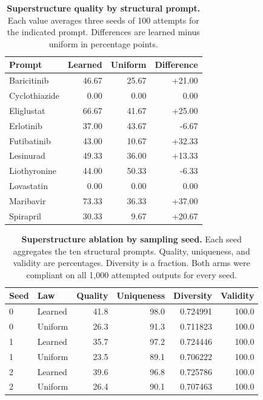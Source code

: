 \begin{table}[t]
\centering
\small
\caption{\small\textbf{Superstructure quality by structural prompt.}
Each value averages three seeds of 100 attempts for the indicated prompt.
Differences are learned minus uniform in percentage points.}
\label{tab:fragment-reference-prompts}
\begin{tabular}{@{}lrrr@{}}
\toprule
Prompt & Learned & Uniform & Difference \\
\midrule
Baricitinib & 46.67 & 25.67 & +21.00 \\
Cyclothiazide & 0.00 & 0.00 & 0.00 \\
Eliglustat & 66.67 & 41.67 & +25.00 \\
Erlotinib & 37.00 & 43.67 & -6.67 \\
Futibatinib & 43.00 & 10.67 & +32.33 \\
Lesinurad & 49.33 & 36.00 & +13.33 \\
Liothyronine & 44.00 & 50.33 & -6.33 \\
Lovastatin & 0.00 & 0.00 & 0.00 \\
Maribavir & 73.33 & 36.33 & +37.00 \\
Spirapril & 30.33 & 9.67 & +20.67 \\
\bottomrule
\end{tabular}
\end{table}

\begin{table}[t]
\centering
\small
\caption{\small\textbf{Superstructure ablation by sampling seed.}
Each seed aggregates the ten structural prompts. Quality, uniqueness, and
validity are percentages. Diversity is a fraction. Both arms were compliant
on all 1,000 attempted outputs for every seed.}
\label{tab:fragment-reference-seeds}
\begin{tabular}{@{}llrrrr@{}}
\toprule
Seed & Law & Quality & Uniqueness & Diversity & Validity \\
\midrule
0 & Learned & 41.8 & 98.0 & 0.724991 & 100.0 \\
0 & Uniform & 26.3 & 91.3 & 0.711823 & 100.0 \\
1 & Learned & 35.7 & 97.2 & 0.724446 & 100.0 \\
1 & Uniform & 23.5 & 89.1 & 0.706222 & 100.0 \\
2 & Learned & 39.6 & 96.8 & 0.725786 & 100.0 \\
2 & Uniform & 26.4 & 90.1 & 0.707463 & 100.0 \\
\bottomrule
\end{tabular}
\end{table}

